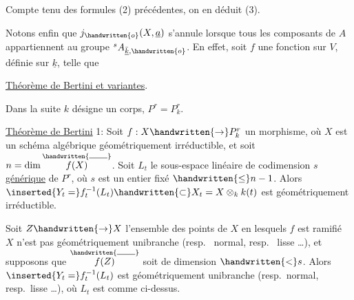 Compte tenu des formules (2) précédentes, on en déduit (3).

Notons enfin que $j_{\handwritten{o}}(X,\underline{a})$ s'annule lorsque tous les composants de $A$ appartiennent au groupe ${}^{s}A_{\bar{\underline{k}},\handwritten{o}}$. En effet, soit $f$ une fonction sur $V$, définie sur $\underline{k}$, telle que


\uline{Théorème de Bertini et variantes}.

Dans la suite $k$ désigne un corps, $P^r=P^r_k$.

\uline{Théorème de Bertini} 1: Soit $f:X\handwritten{\rightarrow}P^r_k$ un morphisme, où $X$ est un schéma algébrique géométriquement irréductible, et soit $n=\dim\overset{\handwritten{\rule{1.9em}{.4pt}}}{f(X)}$. Soit $L_t$ le sous-espace linéaire de codimension $s$ \uline{générique} de $P^r$, où $s$ est un entier fixé $\handwritten{\leq}n-1$. Alors $\inserted{Y_t=}f_t^{-1}(L_t)\handwritten{\subset}X_t=X\otimes_k k(t)$ est géométriquement irréductible.

  Soit $Z\handwritten{\rightarrow}X$  l'ensemble des points de $X$ en lesquels  $f$ est  ramifié   $X$ n'est pas géométriquement unibranche (resp.\  normal, resp.\  lisse \ldots),  et supposons que $\overset{\handwritten{\rule{1.9em}{.4pt}}}{f(Z)}$ soit de dimension $\handwritten{<}s$. Alors $\inserted{Y_t=}f_t^{-1}(L_t)$ est géométriquement unibranche (resp.\ normal, resp.\ lisse \ldots), où $L_t$ est comme ci-dessus.

